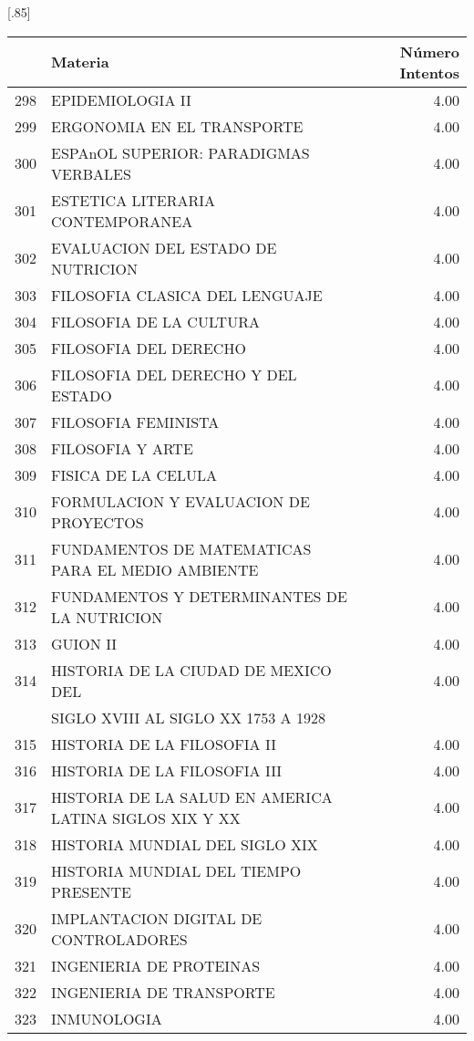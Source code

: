 \documentclass[12pt]{article}
\begin{document}
\begin{table}[ht]
\centering
\scalebox{0.75}[.85]{
\begin{tabular}{rlr}
  \hline
 & Materia & N\'umero Intentos\\ 
  \hline
  298 & EPIDEMIOLOGIA II & 4.00 \\ 
  299 & ERGONOMIA EN EL TRANSPORTE & 4.00 \\ 
  300 & ESPAnOL SUPERIOR: PARADIGMAS VERBALES & 4.00 \\ 
  301 & ESTETICA LITERARIA CONTEMPORANEA & 4.00 \\ 
  302 & EVALUACION DEL ESTADO DE NUTRICION & 4.00 \\ 
  303 & FILOSOFIA CLASICA DEL LENGUAJE & 4.00 \\ 
  304 & FILOSOFIA DE LA CULTURA & 4.00 \\ 
  305 & FILOSOFIA DEL DERECHO & 4.00 \\ 
  306 & FILOSOFIA DEL DERECHO Y DEL ESTADO & 4.00 \\ 
  307 & FILOSOFIA FEMINISTA & 4.00 \\ 
  308 & FILOSOFIA Y ARTE & 4.00 \\ 
  309 & FISICA DE LA CELULA & 4.00 \\ 
  310 & FORMULACION Y EVALUACION DE PROYECTOS & 4.00 \\ 
  311 & FUNDAMENTOS DE MATEMATICAS PARA EL MEDIO AMBIENTE & 4.00 \\ 
  312 & FUNDAMENTOS Y DETERMINANTES DE LA NUTRICION & 4.00 \\ 
  313 & GUION II & 4.00 \\ 
  314 & HISTORIA DE LA CIUDAD DE MEXICO DEL & 4.00 \\ 
   & SIGLO XVIII AL SIGLO XX 1753 A 1928 & \\ 
  315 & HISTORIA DE LA FILOSOFIA II & 4.00 \\ 
  316 & HISTORIA DE LA FILOSOFIA III & 4.00 \\ 
  317 & HISTORIA DE LA SALUD EN AMERICA LATINA SIGLOS XIX Y XX & 4.00 \\ 
  318 & HISTORIA MUNDIAL DEL SIGLO XIX & 4.00 \\ 
  319 & HISTORIA MUNDIAL DEL TIEMPO PRESENTE & 4.00 \\ 
  320 & IMPLANTACION DIGITAL DE CONTROLADORES & 4.00 \\ 
  321 & INGENIERIA DE PROTEINAS & 4.00 \\   
  322 & INGENIERIA DE TRANSPORTE & 4.00 \\ 
  323 & INMUNOLOGIA & 4.00 \\ 

\end{tabular}}
\end{table}
\end{document}
